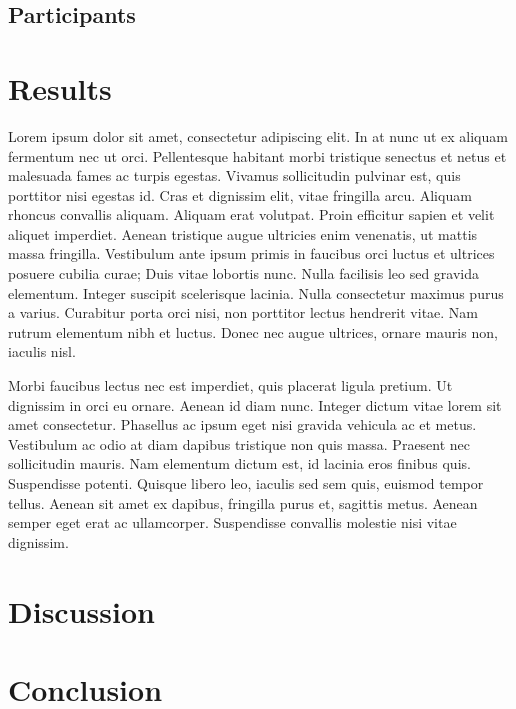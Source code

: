 \section{Participants}

\chapter{Results}

Lorem ipsum dolor sit amet, consectetur adipiscing elit. In at nunc ut ex aliquam fermentum nec ut orci. Pellentesque habitant morbi tristique senectus et netus et malesuada fames ac turpis egestas. Vivamus sollicitudin pulvinar est, quis porttitor nisi egestas id. Cras et dignissim elit, vitae fringilla arcu. Aliquam rhoncus convallis aliquam. Aliquam erat volutpat. Proin efficitur sapien et velit aliquet imperdiet. Aenean tristique augue ultricies enim venenatis, ut mattis massa fringilla. Vestibulum ante ipsum primis in faucibus orci luctus et ultrices posuere cubilia curae; Duis vitae lobortis nunc. Nulla facilisis leo sed gravida elementum. Integer suscipit scelerisque lacinia. Nulla consectetur maximus purus a varius. Curabitur porta orci nisi, non porttitor lectus hendrerit vitae. Nam rutrum elementum nibh et luctus. Donec nec augue ultrices, ornare mauris non, iaculis nisl.

Morbi faucibus lectus nec est imperdiet, quis placerat ligula pretium. Ut dignissim in orci eu ornare. Aenean id diam nunc. Integer dictum vitae lorem sit amet consectetur. Phasellus ac ipsum eget nisi gravida vehicula ac et metus. Vestibulum ac odio at diam dapibus tristique non quis massa. Praesent nec sollicitudin mauris. Nam elementum dictum est, id lacinia eros finibus quis. Suspendisse potenti. Quisque libero leo, iaculis sed sem quis, euismod tempor tellus. Aenean sit amet ex dapibus, fringilla purus et, sagittis metus. Aenean semper eget erat ac ullamcorper. Suspendisse convallis molestie nisi vitae dignissim.



\chapter{Discussion}

\chapter{Conclusion}
\label{sec:conclusion}

